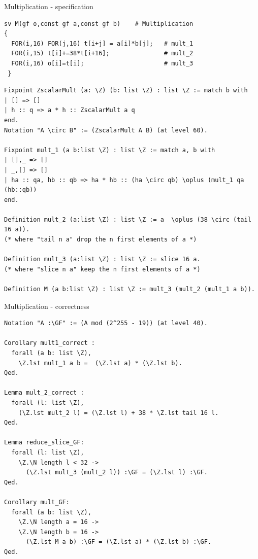 \documentclass[8pt]{beamer}
\begin{document}
%
%

\begin{frame}[fragile]{Multiplication - specification}
  \begin{center}
\begin{lstlisting}[language=cnacl, caption=M, label=cod:languageC101]
sv M(gf o,const gf a,const gf b)    # Multiplication
{
  FOR(i,16) FOR(j,16) t[i+j] = a[i]*b[j];   # mult_1
  FOR(i,15) t[i]+=38*t[i+16];               # mult_2
  FOR(i,16) o[i]=t[i];                      # mult_3
 }
\end{lstlisting}

\begin{lstlisting}[language=Coq, caption=Multiplication, label=cod:languageC102]
Fixpoint ZscalarMult (a: \Z) (b: list \Z) : list \Z := match b with
| [] => []
| h :: q => a * h :: ZscalarMult a q
end.
Notation "A \circ B" := (ZscalarMult A B) (at level 60).

Fixpoint mult_1 (a b:list \Z) : list \Z := match a, b with
| [],_ => []
| _,[] => []
| ha :: qa, hb :: qb => ha * hb :: (ha \circ qb) \oplus (mult_1 qa (hb::qb))
end.

Definition mult_2 (a:list \Z) : list \Z := a  \oplus (38 \circ (tail 16 a)).
(* where "tail n a" drop the n first elements of a *)

Definition mult_3 (a:list \Z) : list \Z := slice 16 a.
(* where "slice n a" keep the n first elements of a *)

Definition M (a b:list \Z) : list \Z := mult_3 (mult_2 (mult_1 a b)).
\end{lstlisting}

  \end{center}
\end{frame}

%
%

\begin{frame}[fragile]{Multiplication - correctness}
  \begin{center}
\begin{lstlisting}[language=Coq, caption=Multiplication | proof of correctness, label=cod:languageC111]
Notation "A :\GF" := (A mod (2^255 - 19)) (at level 40).

Corollary mult1_correct :
  forall (a b: list \Z),
    \Z.lst mult_1 a b =  (\Z.lst a) * (\Z.lst b).
Qed.

Lemma mult_2_correct :
  forall (l: list \Z),
    (\Z.lst mult_2 l) = (\Z.lst l) + 38 * \Z.lst tail 16 l.
Qed.

Lemma reduce_slice_GF:
  forall (l: list \Z),
    \Z.\N length l < 32 ->
      (\Z.lst mult_3 (mult_2 l)) :\GF = (\Z.lst l) :\GF.
Qed.

Corollary mult_GF:
  forall (a b: list \Z),
    \Z.\N length a = 16 ->
    \Z.\N length b = 16 ->
      (\Z.lst M a b) :\GF = (\Z.lst a) * (\Z.lst b) :\GF.
Qed.
\end{lstlisting}

  \end{center}
\end{frame}
\end{document}
